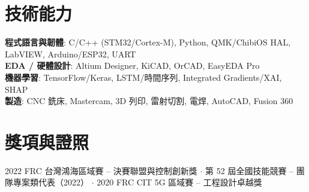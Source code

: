 \documentclass[letterpaper,11pt]{article}
\begin{document}
\section{技術能力}
 \begin{itemize}[leftmargin=0.0in, label={}]
    \small{\item{
     \textbf{程式語言與韌體}{: C/C++ (STM32/Cortex-M), Python, QMK/ChibiOS HAL, LabVIEW, Arduino/ESP32, UART} \\
     \textbf{EDA / 硬體設計}{: Altium Designer, KiCAD, OrCAD, EasyEDA Pro} \\
     \textbf{機器學習}{: TensorFlow/Keras, LSTM/時間序列, Integrated Gradients/XAI, SHAP} \\
     \textbf{製造}{: CNC 銑床, Mastercam, 3D 列印, 雷射切割, 電焊, AutoCAD, Fusion 360} \\
    }}
 \end{itemize}

\section{獎項與證照}
 \begin{itemize}[leftmargin=0.0in, label={}]
    \small{\item{
     2022 FRC 台灣鴻海區域賽 -- 決賽聯盟與控制創新獎 $\cdot$
     第 52 屆全國技能競賽 -- 團隊專案類代表（2022） $\cdot$
     2020 FRC CIT 5G 區域賽 -- 工程設計卓越獎
    }}
 \end{itemize}
\end{document}
